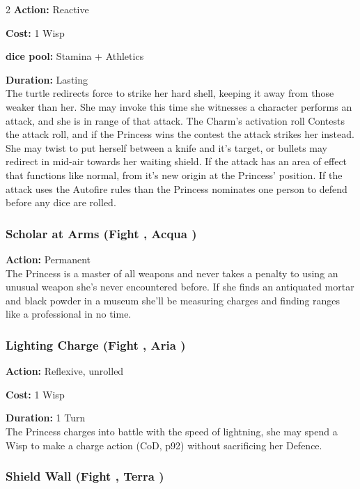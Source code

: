 \begin{multicols}{2}
\noindent \textbf{Action:} Reactive

\noindent \textbf{Cost:} 1 Wisp

\noindent \textbf{dice pool:} Stamina + Athletics

\noindent \textbf{Duration:} Lasting\\

\noindent The turtle redirects force to strike her hard shell, keeping it away from those weaker than her. She may invoke this time she witnesses a character performs an attack, and she is in range of that attack. The Charm's activation roll Contests the attack roll, and if the Princess wins the contest the attack strikes her instead. She may twist to put herself between a knife and it's target, or bullets may redirect in mid-air towards her waiting shield. If the attack has an area of effect that functions like normal, from it's new origin at the Princess' position. If the attack uses the Autofire rules than the Princess nominates one person to defend before any dice are rolled. 

\subsubsection*{Scholar at Arms (Fight \textbullet, Acqua \textbullet)}

\noindent \textbf{Action:} Permanent\\

\noindent The Princess is a master of all weapons and never takes a penalty to using an unusual weapon she's never encountered before. If she finds an antiquated mortar and black powder in a museum she'll be measuring charges and finding ranges like a professional in no time. 

\subsubsection*{Lighting Charge (Fight \textbullet, Aria \textbullet)}

\noindent \textbf{Action:} Reflexive, unrolled

\noindent \textbf{Cost:} 1 Wisp

\noindent \textbf{Duration:} 1 Turn\\

\noindent The Princess charges into battle with the speed of lightning, she may spend a Wisp to make a charge action (CoD, p92) without sacrificing her Defence.


\subsubsection*{Shield Wall (Fight \textbullet\textbullet, Terra \textbullet)}


\end{multicols}
